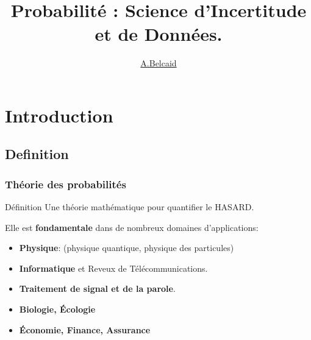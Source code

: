 \documentclass{beamer}
\title{Probabilité : Science d'Incertitude et de Données.}
\author{\underline{A.Belcaid}}
\institute{\small ENSA-Safi}
\begin{document}
\maketitle

\begin{frame}
\tableofcontents
\end{frame}

\section{Introduction}

\subsection{Definition}
\begin{frame}[<+->]
    \frametitle{Théorie des probabilités}

    \begin{block}{Définition}
        Une théorie mathématique pour quantifier le \alert{HASARD}.
    \end{block}

Elle est \textbf{fondamentale} dans de nombreux domaines d'applications:

\begin{itemize}
    \small
    \item \textbf{Physique}: (physique quantique, physique des
        particules)\\[.2cm]
    \item \textbf{Informatique} et Reveux de Télécommunications.\\[.2cm]
    \item \textbf{Traitement de signal et de la parole}.\\[.2cm]
    \item \textbf{Biologie, Écologie}\\[.2cm]
    \item \textbf{Économie, Finance, Assurance}\\[.2cm]
        
\end{itemize}

\end{frame}
\end{document}
